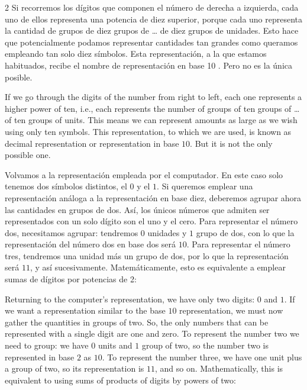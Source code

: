 \begin{paracol}{2}
Si recorremos los dígitos que componen el número de derecha a izquierda, cada uno de ellos representa una potencia de diez superior, porque cada uno representa la cantidad de grupos de diez grupos de \ldots{} de diez grupos de unidades. Esto hace que potencialmente podamos representar cantidades tan grandes como queramos empleando tan solo diez símbolos. Esta representación, a la que estamos habituados, recibe el nombre de representación en base 10 . Pero no es la única posible.

\switchcolumn
If we go through the digits of the number from right to left, each one represents a higher power of ten, i.e., each represents the number of groups of ten groups of \ldots{} of ten groups of units. This means we can represent amounts as large as we wish using only ten symbols. This representation, to which we are used, is known as decimal representation or representation in base $10$. But it is not the only possible one.

\switchcolumn
Volvamos a la representación empleada por el computador. En este caso solo tenemos dos símbolos distintos, el $0$ y el $1$. Si queremos emplear una representación análoga a la representación en base diez, deberemos agrupar ahora las cantidades en grupos de dos. Así, los únicos números que admiten ser representados con un solo dígito son el uno y el cero. Para representar el número dos, necesitamos agrupar: tendremos $0$ unidades y $1$ grupo de dos, con lo que la representación del número dos en base dos será $10$. Para representar el número tres, tendremos una unidad más un grupo de dos, por lo que la representación será $11$, y así sucesivamente. Matemáticamente, esto es equivalente a emplear sumas de dígitos por potencias de 2:

\switchcolumn
Returning to the computer's representation, we have only two digits: $0$ and $1$. If we want a representation similar to the base $10$ representation, we must now gather the quantities in groups of two. So, the only numbers that can be represented with a single digit are one and zero. To represent the number two we need to group: we have $0$ units and $1$ group of two, so the number two is represented in base $2$ as $10$. To represent the number three, we have one unit plus a group of two, so its representation is $11$, and so on. Mathematically, this is equivalent to using sums of products of digits by powers of two:
\end{paracol}

